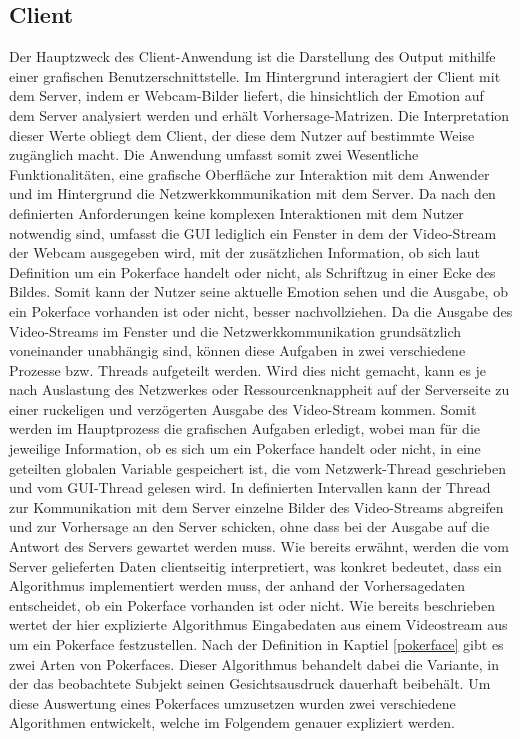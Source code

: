 \documentclass[12pt, a4paper]{scrbook}
\begin{document}
\subsection{Client}
Der Hauptzweck des Client-Anwendung ist die Darstellung des Output mithilfe einer grafischen Benutzerschnittstelle. Im Hintergrund interagiert der Client mit dem Server, indem er Webcam-Bilder liefert, die hinsichtlich der Emotion auf dem Server analysiert werden und erhält Vorhersage-Matrizen. Die Interpretation dieser Werte obliegt dem Client, der diese dem Nutzer auf bestimmte Weise zugänglich macht. Die Anwendung umfasst somit zwei Wesentliche Funktionalitäten, eine grafische Oberfläche zur Interaktion mit dem Anwender und im Hintergrund die Netzwerkkommunikation mit dem Server. Da nach den definierten Anforderungen keine komplexen Interaktionen mit dem Nutzer notwendig sind, umfasst die GUI lediglich ein Fenster in dem der Video-Stream der Webcam ausgegeben wird, mit der zusätzlichen Information, ob sich laut Definition um ein Pokerface handelt oder nicht, als Schriftzug in einer Ecke des Bildes. Somit kann der Nutzer seine aktuelle Emotion sehen und die Ausgabe, ob ein Pokerface vorhanden ist oder nicht, besser nachvollziehen. Da die Ausgabe des Video-Streams im Fenster und die Netzwerkkommunikation grundsätzlich voneinander unabhängig sind, können diese Aufgaben in zwei verschiedene Prozesse bzw. Threads aufgeteilt werden. Wird dies nicht gemacht, kann es je nach Auslastung des Netzwerkes oder Ressourcenknappheit auf der Serverseite zu einer ruckeligen und verzögerten Ausgabe des Video-Stream kommen. Somit werden im Hauptprozess die grafischen Aufgaben erledigt, wobei man für die jeweilige Information, ob es sich um ein Pokerface handelt oder nicht, in eine geteilten globalen Variable gespeichert ist, die vom Netzwerk-Thread geschrieben und vom GUI-Thread gelesen wird. In definierten Intervallen kann der Thread zur Kommunikation mit dem Server einzelne Bilder des Video-Streams abgreifen und zur Vorhersage an den Server schicken, ohne dass bei der Ausgabe auf die Antwort des Servers gewartet werden muss. Wie bereits erwähnt, werden die vom Server gelieferten Daten clientseitig interpretiert, was konkret bedeutet, dass ein Algorithmus implementiert werden muss, der anhand der Vorhersagedaten entscheidet, ob ein Pokerface vorhanden ist oder nicht.\newline
Wie bereits beschrieben wertet der hier explizierte Algorithmus Eingabedaten aus einem Videostream aus um ein Pokerface festzustellen. Nach der Definition in Kaptiel 
\ref{pokerface} gibt es zwei Arten von Pokerfaces. Dieser Algorithmus behandelt dabei die Variante, in der das beobachtete Subjekt seinen Gesichtsausdruck dauerhaft beibehält. 
\newline
Um diese Auswertung eines Pokerfaces umzusetzen wurden zwei verschiedene Algorithmen entwickelt, welche im Folgendem genauer expliziert werden.
\end{document}
